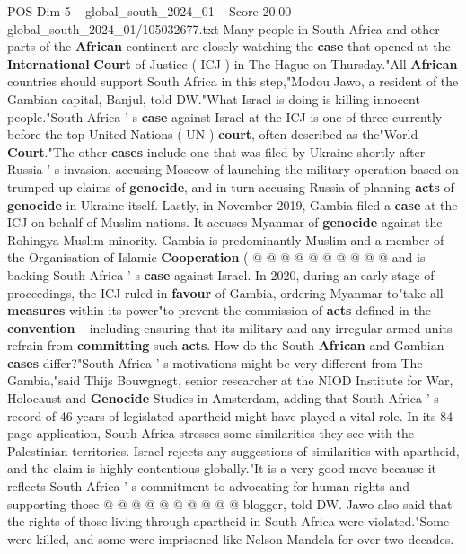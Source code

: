 \begin{textsample}{POS Dim 5 – global\_south\_2024\_01 – Score 20.00 – global\_south\_2024\_01/105032677.txt}  \label{ex:f5_pos_008}
Many people in South Africa and other parts of the \textbf{African} continent are closely watching the \textbf{case} that opened at the \textbf{International} \textbf{Court} of Justice ( ICJ ) in The Hague on Thursday."All \textbf{African} countries should support South Africa in this step,"Modou Jawo, a resident of the Gambian capital, Banjul, told DW."What Israel is doing is killing innocent people."South Africa ' s \textbf{case} against Israel at the ICJ is one of three currently before the top United Nations ( UN ) \textbf{court}, often described as the"World \textbf{Court}."The other \textbf{cases} include one that was filed by Ukraine shortly after Russia ' s invasion, accusing Moscow of launching the military operation based on trumped-up claims of \textbf{genocide}, and in turn accusing Russia of planning \textbf{acts} of \textbf{genocide} in Ukraine itself.
Lastly, in November 2019, Gambia filed a \textbf{case} at the ICJ on behalf of Muslim nations.
It accuses Myanmar of \textbf{genocide} against the Rohingya Muslim minority.
Gambia is predominantly Muslim and a member of the Organisation of Islamic \textbf{Cooperation} ( @ @ @ @ @ @ @ @ @ @ and is backing South Africa ' s \textbf{case} against Israel.
In 2020, during an early stage of proceedings, the ICJ ruled in \textbf{favour} of Gambia, ordering Myanmar to"take all \textbf{measures} within its power"to prevent the commission of \textbf{acts} defined in the \textbf{convention} -- including ensuring that its military and any irregular armed units refrain from \textbf{committing} such \textbf{acts}.
How do the South \textbf{African} and Gambian \textbf{cases} differ?"South Africa ' s motivations might be very different from The Gambia,"said Thijs Bouwgnegt, senior researcher at the NIOD Institute for War, Holocaust and \textbf{Genocide} Studies in Amsterdam, adding that South Africa ' s record of 46 years of legislated apartheid might have played a vital role.
In its 84-page application, South Africa stresses some similarities they see with the Palestinian territories.
Israel rejects any suggestions of similarities with apartheid, and the claim is highly contentious globally."It is a very good move because it reflects South Africa ' s commitment to advocating for human rights and supporting those @ @ @ @ @ @ @ @ @ @ blogger, told DW.
Jawo also said that the rights of those living through apartheid in South Africa were violated."Some were killed, and some were imprisoned like Nelson Mandela for over two decades.

\end{textsample}

